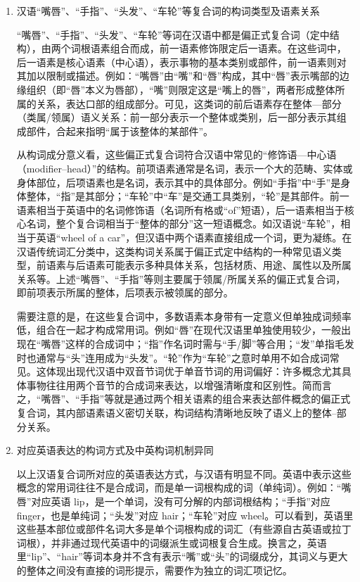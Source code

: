 \documentclass[10pt]{ctexart}
\begin{document}
\begin{enumerate}
    \item 汉语``嘴唇''、``手指''、``头发''、``车轮''等复合词的构词类型及语素关系
    
    ``嘴唇''、``手指''、``头发''、``车轮''等词在汉语中都是偏正式复合词（定中结构），由两个词根语素组合而成，前一语素修饰限定后一语素。在这些词中，后一语素是核心语素（中心语），表示事物的基本类别或部件，前一语素则对其加以限制或描述。例如：``嘴唇''由``嘴''和``唇''构成，其中``唇''表示嘴部的边缘组织（即``唇''本义为唇部），``嘴''则限定这是``嘴上的唇''，两者形成整体所属的关系，表达口部的组成部分。可见，这类词的前后语素存在整体—部分（类属/领属）语义关系：前一部分表示一个整体或类别，后一部分表示其组成部件，合起来指明``属于该整体的某部件''。
    
    从构词成分意义看，这些偏正式复合词符合汉语中常见的``修饰语—中心语（modifier–head）''的结构。前项语素通常是名词，表示一个大的范畴、实体或身体部位，后项语素也是名词，表示其中的具体部分。例如``手指''中``手''是身体整体，``指''是其部分；``车轮''中``车''是交通工具类别，``轮''是其部件。前一语素相当于英语中的名词修饰语（名词所有格或``of''短语），后一语素相当于核心名词，整个复合词相当于``整体的部分''这一短语概念。如汉语说``车轮''，相当于英语``wheel of a car''，但汉语中两个语素直接组成一个词，更为凝练。在汉语传统词汇分类中，这类构词关系属于偏正式定中结构的一种常见语义类型，前语素与后语素可能表示多种具体关系，包括材质、用途、属性以及所属关系等。上述``嘴唇''、``手指''等则主要属于领属/所属关系的偏正式复合词，即前项表示所属的整体，后项表示被领属的部分。

    需要注意的是，在这些复合词中，多数语素本身带有一定意义但单独成词频率低，组合在一起才构成常用词。例如``唇''在现代汉语里单独使用较少，一般出现在``嘴唇''这样的合成词中；``指''作名词时需与``手/脚''等合用；``发''单指毛发时也通常与``头''连用成为``头发''。``轮''作为``车轮''之意时单用不如合成词常见。这体现出现代汉语中双音节词优于单音节词的用词偏好：许多概念尤其具体事物往往用两个音节的合成词来表达，以增强清晰度和区别性。简而言之，``嘴唇''、``手指''等就是通过两个相关语素的组合来表达部件概念的偏正式复合词，其内部语素语义密切关联，构词结构清晰地反映了语义上的整体–部分关系。

    \item 对应英语表达的构词方式及中英构词机制异同
    
    以上汉语复合词所对应的英语表达方式，与汉语有明显不同。英语中表示这些概念的常用词往往不是合成词，而是单一词根构成的词（单纯词）。例如：``嘴唇''对应英语 lip，是一个单词，没有可分解的内部词根结构；``手指''对应 finger，也是单纯词；``头发''对应 hair；``车轮''对应 wheel。可以看到，英语里这些基本部位或部件名词大多是单个词根构成的词汇（有些源自古英语或拉丁词根），并非通过现代英语中的词缀派生或词根复合生成。换言之，英语里``lip''、``hair''等词本身并不含有表示``嘴''或``头''的词缀成分，其词义与更大的整体之间没有直接的词形提示，需要作为独立的词汇项记忆。


\end{enumerate}
\end{document}
